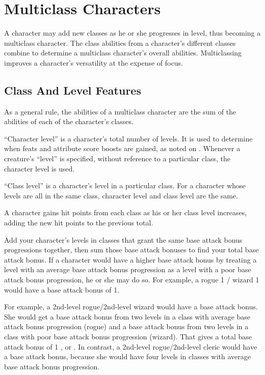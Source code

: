 \section{Multiclass Characters}\label{Multiclass Characters}
A character may add new classes as he or she progresses in level, thus becoming a multiclass character. The class abilities from a character's different classes combine to determine a multiclass character's overall abilities. Multiclassing improves a character's versatility at the expense of focus.

\subsection{Class And Level Features}
As a general rule, the abilities of a multiclass character are the sum
of the abilities of each of the character's classes.

 ``Character level'' is a character's total number of levels. It is used to determine when feats and attribute score boosts are gained, as noted on . Whenever a creature's ``level'' is specified, without reference to a particular class, the character level is used.

\par ``Class level'' is a character's level in a particular class. For a character whose levels are all in the same class, character level and class level are the same.

 A character gains hit points from each class as his or her class level increases, adding the new hit points to the previous total.

 Add your character's levels in classes that grant the same base attack bonus progressions together, then sum those base attack bonuses to find your total base attack bonus. If a character would have a higher base attack bonus by treating a level with an average base attack bonus progression as a level with a poor base attack bonus progression, he or she may do so. For example, a rogue 1 / wizard 1 would have a base attack bonus of 1.

\par For example, a 2nd-level rogue/2nd-level wizard would have a  base attack bonus. She would get a  base attack bonus from two levels in a class with average base attack bonus progression (rogue) and a  base attack bonus from two levels in a class with poor base attack bonus progression (wizard). That gives a total base attack bonus of 1 , or . In contrast, a 2nd-level rogue/2nd-level cleric would have a  base attack bonus, because she would have four levels in classes with average base attack bonus progression.

